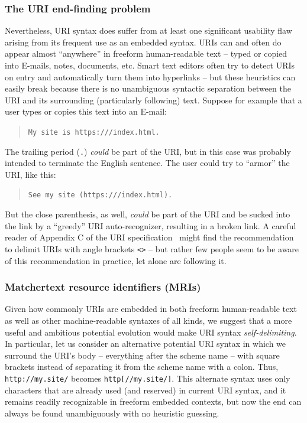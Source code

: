 \subsubsection{The URI end-finding problem}
\label{app:uri:end}

Nevertheless,
URI syntax does suffer from at least one significant usability flaw
arising from its frequent use as an embedded syntax.
URIs can and often do appear almost ``anywhere''
in freeform human-readable text --
\eg typed or copied into E-mails, notes, documents, etc.
Smart text editors often try to detect URIs on entry
and automatically turn them into hyperlinks --
but these heuristics can easily break because
there is no unambiguous syntactic separation between the URI
and its surrounding (particularly following) text.
Suppose for example that a user types or copies this text into an E-mail:

\begin{footnotesize}
\begin{quote}
\texttt{My site is https:///index.html.}
\end{quote}
\end{footnotesize}

The trailing period (\verb|.|) \emph{could} be part of the URI,
but in this case was probably intended to terminate the English sentence.
The user could try to ``armor'' the URI, like this:

\begin{footnotesize}
\begin{quote}
\texttt{See my site (https:///index.html).}
\end{quote}
\end{footnotesize}

But the close parenthesis, as well, \emph{could} be part of the URI
and be sucked into the link by a ``greedy'' URI auto-recognizer,
resulting in a broken link.
A careful reader of Appendix C of the URI specification~\cite{rfc3986}
might find the recommendation to delimit URIs
with angle brackets \verb|<>| --
but rather few people seem to be aware of this recommendation in practice,
let alone are following it.


\subsubsection{Matchertext resource identifiers (MRIs)}
\label{app:uri:mri}

Given how commonly URIs are embedded in both freeform human-readable text
as well as other machine-readable syntaxes of all kinds,
we suggest that a more useful and ambitious potential evolution
would make URI syntax \emph{self-delimiting}.
In particular,
let us consider an alternative potential URI syntax
in which we surround the URI's body -- everything after the scheme name --
with square brackets instead of separating it from the scheme name with a colon.
Thus, \verb|http://my.site/| becomes \verb|http[//my.site/]|.
This alternate syntax uses only characters
that are already used (and reserved) in current URI syntax,
and it remains readily recognizable in freeform embedded contexts,
but now the end can always be found unambiguously with no heuristic guessing.

